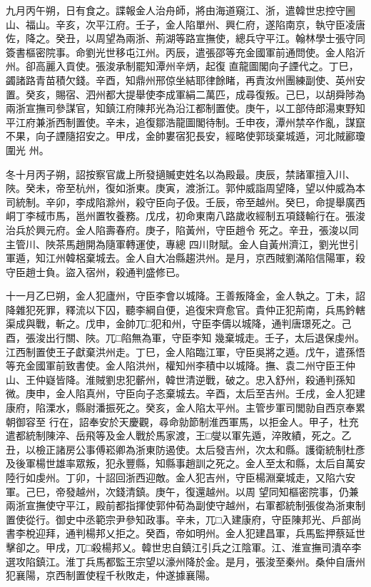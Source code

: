\begin{pinyinscope}
 九月丙午朔，日有食之。諜報金人治舟師，將由海道窺江、浙，遣韓世忠控守圌山、福山。辛亥，次平江府。壬子，金人陷單州、興仁府，遂陷南京，執守臣凌唐佐，降之。癸丑，以周望為兩浙、荊湖等路宣撫使，總兵守平江。翰林學士張守同簽書樞密院事。命劉光世移屯江州。丙辰，遣張邵等充金國軍前通問使。金人陷沂州。卻高麗入貢使。張浚承制罷知潭州辛炳，起復
 直龍圖閣向子諲代之。丁巳，蠲諸路青苗積欠錢。辛酉，知鼎州邢倞坐結耶律餘睹，再責汝州團練副使、英州安置。癸亥，賜宿、泗州都大提舉使李成軍絹二萬匹，成尋復叛。己巳，以胡舜陟為兩浙宣撫司參謀官，知鎮江府陳邦光為沿江都制置使。庚午，以工部侍郎湯東野知平江府兼浙西制置使。辛未，追復鄒浩龍圖閣待制。壬申夜，潭州禁卒作亂，謀竄不果，向子諲隨招安之。甲戌，金帥婁宿犯長安，經略使郭琰棄城遁，河北賊酈瓊圍光
 州。


冬十月丙子朔，詔按察官歲上所發擿贓吏姓名以為殿最。庚辰，禁諸軍擅入川、陜。癸未，帝至杭州，復如浙東。庚寅，渡浙江。郭仲威詣周望降，望以仲威為本司統制。辛卯，李成陷滁州，殺守臣向子伋。壬辰，帝至越州。癸巳，命提舉廣西峒丁李棫市馬，邕州置牧養務。戊戌，初命東南八路歲收經制五項錢輸行在。張浚治兵於興元府。金人陷壽春府。庚子，陷黃州，守臣趙令
 死之。辛丑，張浚以同主管川、陜茶馬趙開為隨軍轉運使，專總
 四川財賦。金人自黃州濟江，劉光世引軍遁，知江州韓梠棄城去。金人自大冶縣趨洪州。是月，京西賊劉滿陷信陽軍，殺守臣趙士負。盜入宿州，殺通判盛修已。



 十一月乙巳朔，金人犯廬州，守臣李會以城降。王善叛降金，金人執之。丁未，詔降雜犯死罪，釋流以下囚，聽李綱自便，追復宋齊愈官。貴仲正犯荊南，兵馬鈐轄渠成與戰，斬之。戊申，金帥兀□犯和州，守臣李儔以城降，通判唐璟死之。己酉，張浚出行關、陜。兀□陷無為軍，守臣李知
 幾棄城走。壬子，太后退保虔州。江西制置使王子獻棄洪州走。丁巳，金人陷臨江軍，守臣吳將之遁。戊午，遣孫悟等充金國軍前致書使。金人陷洪州，權知州李積中以城降。撫、袁二州守臣王仲山、王仲嶷皆降。淮賊劉忠犯蘄州，韓世清逆戰，破之。忠入舒州，殺通判孫知微。庚申，金人陷真州，守臣向子忞棄城去。辛酉，太后至吉州。壬戌，金人犯建康府，陷溧水，縣尉潘振死之。癸亥，金人陷太平州。主管步軍司閭勍自西京奉累朝御容至
 行在，詔奉安於天慶觀，尋命勍節制淮西軍馬，以拒金人。甲子，杜充遣都統制陳淬、岳飛等及金人戰於馬家渡，王□燮以軍先遁，淬敗績，死之。乙丑，以檢正諸房公事傅崧卿為浙東防遏使。太后發吉州，次太和縣。護衛統制杜彥及後軍楊世雄率眾叛，犯永豐縣，知縣事趙訓之死之。金人至太和縣，太后自萬安陸行如虔州。丁卯，十詔回浙西迎敵。金人犯吉州，守臣楊淵棄城走，又陷六安軍。己巳，帝發越州，次錢清鎮。庚午，復還越州。以周
 望同知樞密院事，仍兼兩浙宣撫使守平江，殿前都指揮使郭仲荀為副使守越州，右軍都統制張俊為浙東制置使從行。御史中丞範宗尹參知政事。辛未，兀□入建康府，守臣陳邦光、戶部尚書李梲迎拜，通判楊邦乂拒之。癸酉，帝如明州。金人犯建昌軍，兵馬監押蔡延世擊卻之。甲戌，兀□殺楊邦乂。韓世忠自鎮江引兵之江陰軍。江、淮宣撫司潰卒李選攻陷鎮江。淮丁兵馬都監王宗望以濠州降於金。是月，張浚至秦州。桑仲自唐州
 犯襄陽，京西制置使程千秋敗走，仲遂據襄陽。




\end{pinyinscope}
